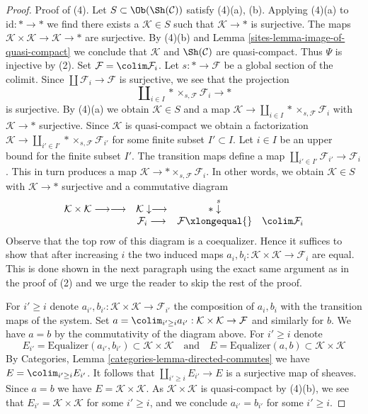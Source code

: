 \begin{proof}
\medskip\noindent
Proof of (4). Let $S \subset \Ob(\Sh(\mathcal{C}))$ satisfy (4)(a), (b).
Applying (4)(a) to $\text{id} : * \to *$ we find there exists a
$\mathcal{K} \in S$ such that $\mathcal{K} \to *$ is surjective.
The maps $\mathcal{K} \times \mathcal{K} \to \mathcal{K} \to *$
are surjective.
By (4)(b) and Lemma \ref{sites-lemma-image-of-quasi-compact} we conclude
that $\mathcal{K}$ and $\Sh(\mathcal{C})$ are quasi-compact.
Thus $\Psi$ is injective by (2).
Set $\mathcal{F} = \colim \mathcal{F}_i$.
Let $s : * \to \mathcal{F}$ be a global section of the colimit.
Since $\coprod \mathcal{F}_i \to \mathcal{F}$ is surjective,
we see that the projection
$$
\coprod\nolimits_{i \in I} * \times_{s, \mathcal{F}} \mathcal{F}_i \to *
$$
is surjective. By (4)(a) we obtain $\mathcal{K} \in S$ and a map
$\mathcal{K} \to \coprod_{i \in I} * \times_{s, \mathcal{F}} \mathcal{F}_i$
with $\mathcal{K} \to *$ surjective.
Since $\mathcal{K}$ is quasi-compact we obtain a factorization
$\mathcal{K} \to \coprod_{i' \in I'} * \times_{s, \mathcal{F}} \mathcal{F}_{i'}$
for some finite subset $I' \subset I$. Let $i \in I$ be an upper
bound for the finite subset $I'$. The transition maps define a map
$\coprod_{i' \in I'} \mathcal{F}_{i'} \to \mathcal{F}_i$.
This in turn produces a map
$\mathcal{K} \to * \times_{s, \mathcal{F}} \mathcal{F}_i$.
In other words, we obtain $\mathcal{K} \in S$ with
$\mathcal{K} \to *$ surjective and a commutative diagram
$$
\begin{array}{cccc}\mathcal{K} \times \mathcal{K} \longrightarrow\longrightarrow & \mathcal{K} \downarrow\longrightarrow & {*} \overset{s}{\downarrow} &  \\  & \mathcal{F}_i \longrightarrow & \mathcal{F} \xlongequal{} & \colim \mathcal{F}_i\end{array}
$$
Observe that the top row of this diagram is a coequalizer.
Hence it suffices to show that after increasing $i$ the two
induced maps
$a_i, b_i : \mathcal{K} \times \mathcal{K} \to \mathcal{F}_i$
are equal. This is done shown in the next paragraph
using the exact same argument as in the proof of (2)
and we urge the reader to skip the rest of the proof.

\medskip\noindent
For $i' \geq i$ denote
$a_{i'}, b_{i'} : \mathcal{K} \times \mathcal{K} \to \mathcal{F}_{i'}$
the composition of $a_i, b_i$ with the transition maps of the system.
Set $a = \colim_{i' \geq i} a_{i'} :
\mathcal{K} \times \mathcal{K} \to \mathcal{F}$ and similarly for $b$.
We have $a = b$ by the commutativity of the diagram above.
For $i' \geq i$ denote
$$
E_{i'} = \text{Equalizer}(a_{i'}, b_{i'}) \subset
\mathcal{K} \times \mathcal{K}
\quad\text{and}\quad
E = \text{Equalizer}(a, b) \subset
\mathcal{K} \times \mathcal{K}
$$
By Categories, Lemma \ref{categories-lemma-directed-commutes} we have
$E = \colim_{i' \geq i} E_{i'}$. It follows that
$\coprod_{i' \geq i} E_{i'} \to E$
is a surjective map of sheaves. Since $a = b$ we have
$E = \mathcal{K} \times \mathcal{K}$.
As $\mathcal{K} \times \mathcal{K}$ is quasi-compact by (4)(b),
we see that $E_{i'} = \mathcal{K} \times \mathcal{K}$ for some
$i' \geq i$, and we conclude $a_{i'} = b_{i'}$ for some $i' \geq i$.
\end{proof}


